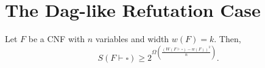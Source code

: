 % 
% 
% 
%  
% 
% 
%  
% 
% 
% 


\section{The Dag-like Refutation Case}


\begin{tcolorbox}[colframe=white, colback=blue!4, boxrule=0mm, sharp corners]
\begin{theorem}
Let $F$ be a CNF with $n$ variables and width $w(F) = k$.
Then,  
$$
S(F \vdash \square) \geq 
    2^{
        \Omega
            \left(
                \frac{
                    \left(
                        W(F \vdash \square) - w(F)
                    \right)^2
                    }
                    {n}
            \right)}.
$$
\end{theorem}
\end{tcolorbox}
 


